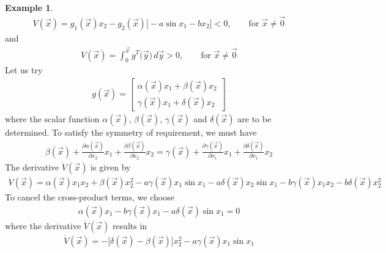 \documentclass[11pt,a4paper,oneside]{book}
\numberwithin{equation}{section}
\theoremstyle{it}
\theoremstyle{definition}
\newtheorem{example}{Example}[chapter]
\begin{document}
\begin{example}
	\begin{equation*}
		\begin{aligned}
			\dot{V}(\vec{x})=g_1(\vec{x})x_2-g_2(\vec{x})\Big[-a\sin x_1 -b 
			x_2\Big]<0,\qquad\text{for }\vec{x}\ne\vec{0}
		\end{aligned}
	\end{equation*}
	and
	\begin{equation*}
		\begin{aligned}
			V(\vec{x})=\int_{0}^{\vec{x}} g^T \big(\vec{y}\big) 
			\,d\vec{y}>0,\qquad\text{for }\vec{x}\ne\vec{0}
		\end{aligned}
	\end{equation*}
	Let us try
	\begin{equation*}
		\begin{aligned}
			g(\vec{x})=\begin{bmatrix}
				\alpha(\vec{x})x_1+\beta(\vec{x})x_2 \\[6pt] 
				\gamma(\vec{x})x_1+\delta(\vec{x})x_2
			\end{bmatrix}
		\end{aligned}
	\end{equation*}
	where the scalar function $\alpha(\vec{x})$, $\beta(\vec{x})$, 
	$\gamma(\vec{x})$ and $\delta(\vec{x})$ are to be determined. To satisfy 
	the symmetry of requirement, we must have
	\begin{equation}\label{example1}
		\begin{aligned}
			\beta(\vec{x})+\frac{\partial\alpha(\vec{x})}{\partial 
			x_2}x_1+\frac{\partial\beta(\vec{x})}{\partial 
			x_2}x_2=\gamma(\vec{x})+\frac{\partial\gamma(\vec{x})}{\partial 
			x_1}x_1+\frac{\partial\delta(\vec{x})}{\partial x_1}x_2
		\end{aligned}
	\end{equation}
	The derivative $\dot{V}(\vec{x})$ is given by
	\begin{equation*}
		\begin{aligned}
			\dot{V}(\vec{x}) = 
			\alpha(\vec{x})x_1x_2+\beta(\vec{x})x_2^2-a\gamma(\vec{x})x_1\sin 
			x_1-a\delta(\vec{x})x_2\sin 
			x_1-b\gamma(\vec{x})x_1x_2-b\delta(\vec{x})x_2^2
		\end{aligned}
	\end{equation*}
	To cancel the cross-product terms, we choose
	\begin{equation}\label{example2}
		\begin{aligned}
			\alpha(\vec{x})x_1-b\gamma(\vec{x})x_1-a\delta(\vec{x})\sin x_1=0
		\end{aligned}
	\end{equation}
	where the derivative $\dot{V}(\vec{x})$ results in 
	\begin{equation*}
		\begin{aligned}
			\dot{V}(\vec{x}) = 
			-\Big[\delta(\vec{x})-\beta(\vec{x})\Big]x_2^2-a\gamma(\vec{x})x_1\sin
			 x_1
		\end{aligned}
	\end{equation*}
	

\end{example}
\end{document}

